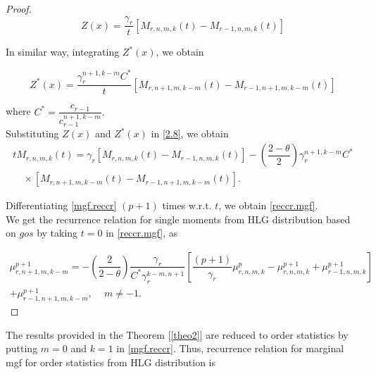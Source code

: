 \documentclass[11pt,a4paper]{article}
\numberwithin{equation}{section}
\begin{document}
\begin{proof}
\begin{equation}
			Z(x)=\dfrac{\gamma_{r}}{t}\left[M_{r,n,m,k}(t)-M_{r-1,n,m,k}(t)\right]\nonumber

		\end{equation}

		In similar way, integrating $Z^{*}(x)$, we obtain

		\begin{equation}

			Z^{*}(x)=\dfrac{\gamma_{r}^{n+1,k-m}C^{*}}{t}\left[M_{r,n+1,m,k-m}(t)-M_{r-1,n+1,m,k-m}(t)\right]\nonumber

		\end{equation}

		where $C^{*}=\dfrac{c_{r-1}}{c_{r-1}^{n+1,k-m}}.$\\

		Substituting $Z(x)$ and $Z^{*}(x)$ in \eqref{2.8}, we obtain\\

		\begin{eqnarray}\label{mgf.reccr}

			tM_{r,n,m,k}(t)={\gamma_{r}}\left[M_{r,n,m,k}(t)-M_{r-1,n,m,k}(t)\right]-\left(\dfrac{2-\theta}{2}\right){\gamma_{r}^{n+1,k-m}C^{*}}\nonumber \\ \,\,\,\,\,\, \times \left[M_{r,n+1,m,k-m}{(t)}-M_{r-1,n+1,m,k-m}(t)\right].

		\end{eqnarray}

		Differentiating \eqref{mgf.reccr} $(p+1)$ times w.r.t. $t$, we obtain \eqref{reccr.mgf}.\\

		We get the recurrence relation for single moments from HLG distribution based on $\textit{gos}$ by taking $t=0$ in \eqref{reccr.mgf}, as

		\begin{eqnarray}\label{2.10}

			\mu_{r,n+1,m,k-m}^{p+1}=-{\left(\dfrac{2}{2-\theta}\right)}\dfrac{\gamma_{r}}{C^{*}\gamma_{r}^{k-m,n+1}}\left[\dfrac{(p+1)}{\gamma_{r}}\mu_{r,n,m,k}^{p}-\mu_{r,n,m,k}^{p+1}+\mu_{r-1,n,m,k}^{p+1}\right]\nonumber\\

			+\mu_{r-1,n+1,m,k-m}^{p+1},\,\,\,\,\,\,\, m\ne-1.\

		\end{eqnarray}

	\end{proof}

\noindent The results provided in the Theorem [\ref{theo2}] are reduced to order statistics by putting $m=0$ and $k=1$ in \eqref{mgf.reccr}. Thus, recurrence relation for marginal mgf for order statistics from HLG distribution is 
\end{document}
